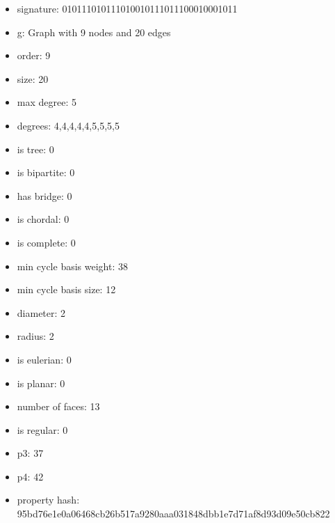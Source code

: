 \newpage
\begin{figure}
\end{figure}
\begin{itemize}
\item signature: 010111010111010010111011100010001011
\item g: Graph with 9 nodes and 20 edges
\item order: 9
\item size: 20
\item max degree: 5
\item degrees: 4,4,4,4,4,5,5,5,5
\item is tree: 0
\item is bipartite: 0
\item has bridge: 0
\item is chordal: 0
\item is complete: 0
\item min cycle basis weight: 38
\item min cycle basis size: 12
\item diameter: 2
\item radius: 2
\item is eulerian: 0
\item is planar: 0
\item number of faces: 13
\item is regular: 0
\item p3: 37
\item p4: 42
\item property hash: 95bd76e1e0a06468cb26b517a9280aaa031848dbb1e7d71af8d93d09e50cb822
\end{itemize}
